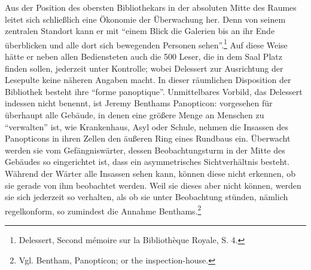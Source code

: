 Aus der Position des obersten Bibliothekars in der absoluten Mitte des
Raumes leitet sich schließlich eine Ökonomie der Überwachung her. Denn
von seinem zentralen Standort kann er mit \enquote{einem Blick die
Galerien bis an ihr Ende überblicken und alle dort sich bewegenden
Personen sehen}.\footnote{Delessert, Second mémoire sur la Bibliothèque
  Royale, S. 4.} Auf diese Weise hätte er neben allen Bediensteten auch
die 500 Leser, die in dem Saal Platz finden sollen, jederzeit unter
Kontrolle; wobei Delessert zur Ausrichtung der Lesepulte keine näheren
Angaben macht. In dieser räumlichen Disposition der Bibliothek besteht
ihre \enquote{forme panoptique}. Unmittelbares Vorbild, das Delessert
indessen nicht benennt, ist Jeremy Benthams Panopticon: vorgesehen für
überhaupt alle Gebäude, in denen eine größere Menge an Menschen zu
\enquote{verwalten} ist, wie Krankenhaus, Asyl oder Schule, nehmen die
Insassen des Panopticons in ihren Zellen den äußeren Ring eines Rundbaus
ein. Überwacht werden sie vom Gefängniswärter, dessen Beobachtungsturm
in der Mitte des Gebäudes so eingerichtet ist, dass ein asymmetrisches
Sichtverhältnis besteht. Während der Wärter alle Insassen sehen kann,
können diese nicht erkennen, ob sie gerade von ihm beobachtet werden.
Weil sie dieses aber nicht können, werden sie sich jederzeit so
verhalten, als ob sie unter Beobachtung stünden, nämlich regelkonform,
so zumindest die Annahme Benthams.\footnote{Vgl. Bentham, Panopticon; or
  the inspection-house.}

